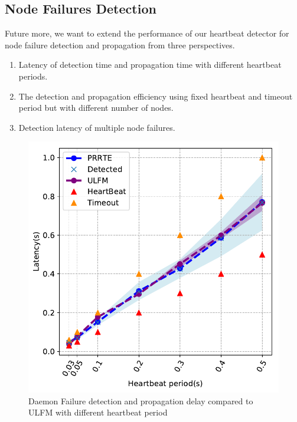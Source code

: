 \documentclass[sigconf]{acmart}
\newcommand{\ulfm}[0]{\textsc{ULFM}\xspace}
\begin{document}
\subsection{Node Failures Detection}
Future more, we want to extend the performance of our heartbeat detector  for node failure detection and propagation from  three perspectives. 
\begin{enumerate}
  \item Latency of detection time and propagation time with different heartbeat periods.
  \item The detection and propagation efficiency using fixed heartbeat and timeout period but with different number of nodes.
  \item Detection latency of multiple node failures.
\end{enumerate}

\begin{figure}[h]
  \centering
  \includegraphics[width=\linewidth]{PRRTE_ULFM_comparision.pdf}
  \caption{Daemon Failure detection and propagation delay compared to \ulfm with different heartbeat period}
  \label{fig:node_failure_hb}
\end{figure}
\end{document}
